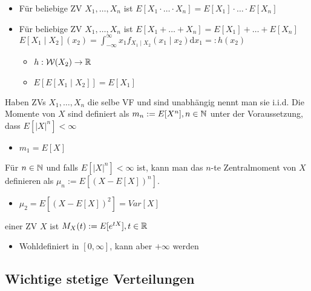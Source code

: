 \begin{itemize}
\begin{itemize}
            \item Für beliebige ZV $X_1, \dots, X_n$ ist $E[X_1 \cdot \dots \cdot X_n] = E[X_1] \cdot \dots \cdot E[X_n]$
            \item Für beliebige ZV $X_1, \dots, X_n$ ist $E[X_1 + \dots + X_n] = E[X_1] + \dots + E[X_n]$
             $E[X_1 \mid X_2](x_2) = \int_{-\infty}^\infty x_1 f_{X_1 \mid X_2} (x_1 \mid x_2) \mathrm{d}x_1 =: h(x_2)$
            \begin{itemize}
                \item $h : \mathcal{W}(X_2) \to \mathbb{R}$
                \item $E[E[X_1 \mid X_2]] = E[X_1]$
            \end{itemize}
        \end{itemize}
     Haben ZVs $X_1, \dots, X_n$ die selbe VF und sind unabhängig nennt man sie i.i.d.
     Die Momente von $X$ sind definiert als $m_n := E[X^n], n \in \mathbb{N}$ unter der Voraussetzung, dass $E[|X|^n] < \infty$
        \begin{itemize}
            \item $m_1 = E[X]$
        \end{itemize}
     Für $n \in \mathbb{N}$ und falls $E[|X|^n] < \infty$ ist, kann man das $n$-te Zentralmoment von $X$ definieren als $\mu_n := E[(X - E[X])^n]$.
        \begin{itemize}
            \item $\mu_2 = E[(X - E[X])^2] = Var[X]$
        \end{itemize}
     einer ZV $X$ ist $M_X(t) := E[e^{tX}], t \in \mathbb{R}$
        \begin{itemize}
            \item Wohldefiniert in $[0, \infty]$, kann aber $+\infty$ werden
        \end{itemize}
\end{itemize}

\subsection{Wichtige stetige Verteilungen}
